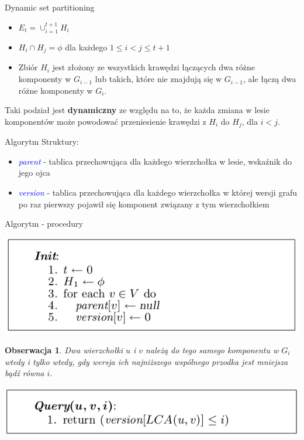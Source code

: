 \documentclass{beamer}
\newtheorem{obs}{Obserwacja}
\newcommand{\emp}[1]{\textcolor{blue}{\textit{#1}}}
\begin{document}
\begin{frame}{Dynamic set partitioning}
\begin{itemize}
\item $E_t = \cup^{t+1}_{i=1}H_i$
\item $H_i \cap H_j = \phi$ dla każdego $1 \leq i < j \leq t+1$
\item Zbiór $H_i$ jest złożony ze wszystkich krawędzi łączących dwa różne komponenty w $G_{i-1}$ lub takich, które nie znajdują się w $G_{i-1}$, ale łączą dwa różne komponenty w $G_i$.
\end{itemize}

\begin{block}{}
Taki podział jest \textbf{dynamiczny} ze względu na to, że każda zmiana w lesie komponentów może powodować przeniesienie krawędzi z $H_i$ do $H_j$, dla $i < j$.
\end{block}
\end{frame}

\begin{frame}{Algorytm}
Struktury:
\begin{itemize}
\item \emp{parent} - tablica przechowująca dla każdego wierzchołka w lesie, wskaźnik do jego ojca
\item \emp{version} - tablica przechowująca dla każdego wierzchołka w której wersji grafu po raz pierwszy pojawił się komponent związany z tym wierzchołkiem
\end{itemize}
\end{frame}

\begin{frame}{Algorytm - procedury}
\begin{center}
\includegraphics[scale=0.4]{Init.png}
\end{center}

\begin{obs}
Dwa wierzchołki $u$ i $v$ należą do tego samego komponentu w $G_i$ wtedy i tylko wtedy, gdy wersja ich najniższego wspólnego przodka jest mniejsza bądź równa $i$.
\end{obs}

\begin{center}
\includegraphics[scale=0.4]{Query.png}
\end{center}
\end{frame}
\end{document}

